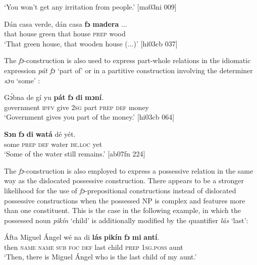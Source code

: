 \glt ‘You won’t get any irritation from people.’ [ma03ni 009]
\z


\ea%
    \label{ex:key:245}
    \gll Dán  casa    verde,  dán  casa    \textbf{fɔ}  \textbf{madera}  \op...\cp\\
that  house  green  that  house  \textsc{prep}  wood\\

\glt ‘That green house, that wooden house (...)’ [hi03cb 037]
\z

The \textit{fɔ}-construction is also used to express part-whole relations in the idiomatic expression \textit{pát fɔ} ‘part of’  or in a partitive construction involving the determiner \textit{sɔn} ‘some’ : 


\ea%
    \label{ex:key:246}
    \gll Gɔ́bna    de  gí  yu  \textbf{pát}  \textbf{fɔ}  \textbf{di}  \textbf{mɔní}.\\
government  \textsc{ipfv}  give  \textsc{2sg}  part  \textsc{prep}  \textsc{def}  money\\

\glt ‘Government gives you part of the money.’ [hi03cb 064]
\z


\ea%
    \label{ex:key:247}
    \gll \textbf{Sɔn}    \textbf{fɔ}  \textbf{di}  \textbf{watá}  dé    yét.\\
some  \textsc{prep}  \textsc{def}  water  \textsc{be.loc}  yet\\

\glt ‘Some of the water still remains.’ [ab07fn 224]
\z

The \textit{fɔ}-construction is also employed to express a possessive relation in the same way as the dislocated possessive construction. There appears to be a stronger likelihood for the use of \textit{fɔ}-prepositional constructions instead of dislocated possessive constructions when the possessed NP is complex and features more than one constituent. This is the case in the following example, in which the possessed noun \textit{pikín} ‘child’ is additionally modified by the quantifier \textit{lás} ‘last’: 


\ea%
    \label{ex:key:248}
    \gll \'{A}fta    Miguel  Ángel  wé  na  di  \textbf{lás}  \textbf{pikín}  \textbf{fɔ}  \textbf{mi}    \textbf{antí}.\\
then  \textsc{name}  \textsc{name}  \textsc{sub}  \textsc{foc}  \textsc{def}  last  child  \textsc{prep}  \textsc{1sg.poss}  aunt\\

\glt ‘Then, there is Miguel Ángel who is the last child of my aunt.’ \textstylePichiexamplenumberZchnZchn{[fr03ft 143]}
\z

